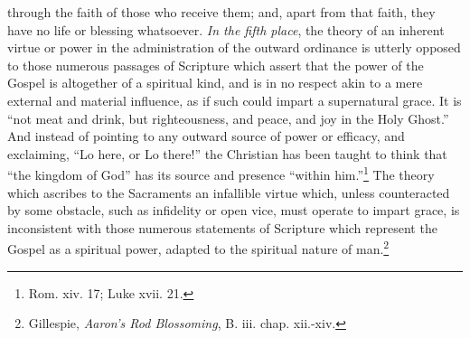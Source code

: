 \documentclass[english,]{book}
\begin{document}
through the faith of those who receive them; and, apart from that faith, they have no life or blessing whatsoever. \emph{In the fifth place}, the theory of an inherent virtue or power in the administration of the outward ordinance is utterly opposed to those numerous passages of Scripture which assert that the power of the Gospel is altogether of a spiritual kind, and is in no respect akin to a mere external and material influence, as if such could impart a supernatural grace. It is ``not meat and drink, but righteousness, and peace, and joy in the Holy Ghost.'' And instead of pointing to any outward source of power or efficacy, and exclaiming, ``Lo here, or Lo there!'' the Christian has been taught to think that ``the kingdom of God'' has its source and presence ``within him.''\footnote{Rom. xiv. 17; Luke xvii. 21.} The theory which ascribes to the Sacraments an infallible virtue which, unless counteracted by some obstacle, such as infidelity or open vice, must operate to impart grace, is inconsistent with those numerous statements of Scripture which represent the Gospel as a spiritual power, adapted to the spiritual nature of man.\footnote{Gillespie, \emph{Aaron's Rod Blossoming}, B. iii. chap. xii.-xiv.}
\end{document}

